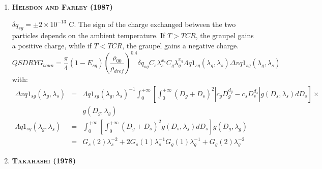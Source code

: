 \begin{enumerate}

  \item {\bf \textsc{Helsdon and Farley (1987)}}

$\delta q_{sg} = \pm 2 \times 10^{-13}$ C.
The sign of the charge exchanged between the two particles depends on the ambient temperature.
If $T > TCR$, the graupel gains a positive charge, while if $T < TCR$, the graupel gains a negative charge.
\begin{equation}
  QSDRYG_{boun} = \frac{\pi}{4} (1 - E_{sg})
                  \left( \frac{\rho _{00}}{\rho _{dref}} \right)^{0.4}
                  \delta q_{sg} C_s \lambda _s ^{x_s} C_g \lambda _g ^{x_g}
                  \Lambda q1_{sg} (\lambda _g, \lambda _s)
                  \Delta vq1_{sg} (\lambda _g, \lambda _s)
\end{equation}
with:
\begin{eqnarray}
  \Delta vq1_{sg} (\lambda _g, \lambda _s) &=&
    \Lambda q1_{sg} (\lambda _g, \lambda _s)^{-1} \int_0 ^{+ \infty} \left[ 
      \int_0 ^{+ \infty} (D_g + D_s)^2 |c_g D_g ^{d_g} - c_s D_s ^{d_s}|
      g(D_s , \lambda _s) dD_s \right] \times \nonumber \\
      & & g(D_g , \lambda _g) \\
  \Lambda q1_{sg} (\lambda _g, \lambda _s) &=&
    \int_0 ^{+ \infty} \left[ \int_0 ^{+ \infty} (D_g + D_s)^2
      g(D_s , \lambda _s) dD_s \right] g(D_g , \lambda _g) \nonumber \\
    &=& G_s (2) \lambda _s ^{-2} + 2 G_s (1) \lambda _s ^{-1} G_g (1)
        \lambda _g ^{-1} + G_g (2) \lambda _g ^{-2} 
\end{eqnarray}


  \item {\bf \textsc{Takahashi (1978)}}


\end{enumerate}
